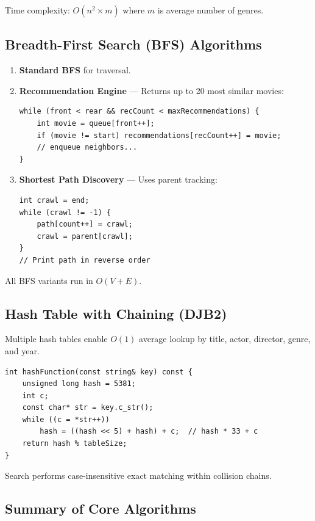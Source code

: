 \documentclass[conference]{IEEEtran}
\begin{document}
Time complexity: $O(n^2 \times m)$ where $m$ is average number of genres.

\subsection{Breadth-First Search (BFS) Algorithms}

\begin{enumerate}
    \item \textbf{Standard BFS} for traversal.
    \item \textbf{Recommendation Engine} — Returns up to 20 most similar movies:
\begin{lstlisting}[caption={recommendMovies() using BFS}]
while (front < rear && recCount < maxRecommendations) {
    int movie = queue[front++];
    if (movie != start) recommendations[recCount++] = movie;
    // enqueue neighbors...
}
\end{lstlisting}

    \item \textbf{Shortest Path Discovery} — Uses parent tracking:
\begin{lstlisting}[caption={Path reconstruction in BFS_ShortestPath()}]
int crawl = end;
while (crawl != -1) {
    path[count++] = crawl;
    crawl = parent[crawl];
}
// Print path in reverse order
\end{lstlisting}
\end{enumerate}

All BFS variants run in $O(V + E)$.

\subsection{Hash Table with Chaining (DJB2)}

Multiple hash tables enable $O(1)$ average lookup by title, actor, director, genre, and year.

\begin{lstlisting}[caption={DJB2 Hash Function}]
int hashFunction(const string& key) const {
    unsigned long hash = 5381;
    int c;
    const char* str = key.c_str();
    while ((c = *str++))
        hash = ((hash << 5) + hash) + c;  // hash * 33 + c
    return hash % tableSize;
}
\end{lstlisting}

Search performs case-insensitive exact matching within collision chains.

\subsection{Summary of Core Algorithms}
\end{document}
